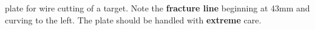 \MgZnCa plate for wire cutting of a target. Note the \textbf{fracture line} beginning at 43mm and curving to the left. The plate should be handled with \textbf{extreme} care.